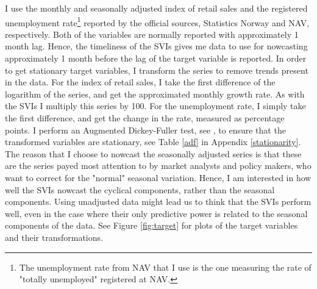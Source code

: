I use the monthly and seasonally adjusted index of retail sales and the registered unemployment rate\footnote{The unemployment rate from NAV that I use is the one measuring the rate of "totally unemployed" registered at NAV.} reported by the official sources, Statistics Norway and NAV, respectively. Both of the variables are normally reported with approximately 1 month lag. Hence, the timeliness of the SVIs gives me data to use for nowcasting approximately 1 month before the lag of the target variable is reported. In order to get stationary target variables, I transform the series to remove trends present in the data. For the index of retail sales, I take the first difference of the logarithm of the series, and get the approximated monthly growth rate. As with the SVIs I multiply this series by 100. For the unemployment rate, I simply take the first difference, and get the change in the rate, measured as percentage points. I perform an Augmented Dickey-Fuller test, see \textcite{dickey1979}, to ensure that the transformed variables are stationary, see Table \ref{adf} in Appendix \ref{stationarity}. The reason that I choose to nowcast the seasonally adjusted series is that these are the series payed most attention to by market analysts and policy makers, who want to correct for the "normal" seasonal variation. Hence, I am interested in how well the SVIs nowcast the cyclical components, rather than the seasonal components. Using unadjusted data might lead us to think that the SVIs perform well, even in the case where their only predictive power is related to the seasonal components of the data. See Figure \ref{fig:target} for plots of the target variables and their transformations.

